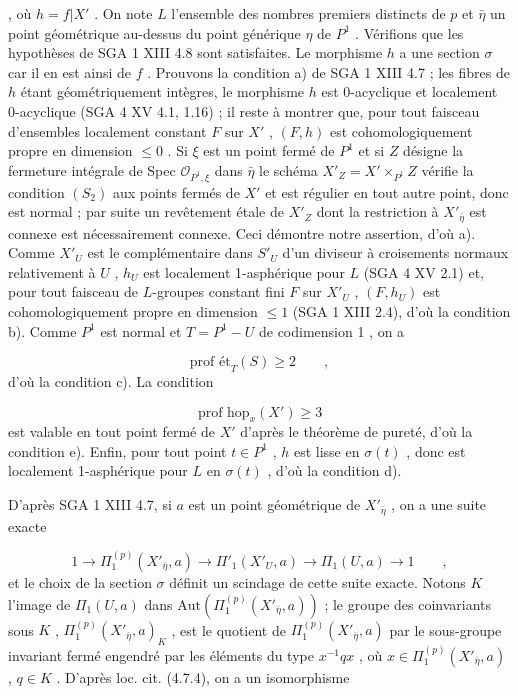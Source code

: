 \qquad ,
où $h = f|X'$ . On note $L$ l'ensemble des nombres premiers distincts de $p$ et $\bar{\eta}$ un point géométrique au-dessus du point générique $\eta$ de $P^1$ . Vérifions que les hypothèses de SGA 1 XIII 4.8 sont satisfaites. Le morphisme $h$ a une section $\sigma$ car il en est ainsi de $f$ . Prouvons la condition a) de SGA 1 XIII 4.7 ; les fibres de $h$ étant géométriquement intègres, le morphisme $h$ est 0-acyclique et localement 0-acyclique (SGA 4 XV 4.1, 1.16) ; il reste à montrer que, pour tout faisceau d'ensembles localement constant $F$ sur $X'$ , $(F,h)$ est cohomologiquement propre en dimension $\leqslant 0$ . Si $\xi$ est un point fermé de $P^1$ et si $Z$ désigne la fermeture intégrale de Spec $\mathcal{O}_{P^1,\xi}$ dans $\bar{\eta}$ le schéma $X'_Z = X'\times_{P^1} Z$ vérifie la condition $(S_2)$ aux points fermés de $X'$ et est régulier en tout autre point, donc est normal ; par suite un revêtement étale de $X'_Z$ dont la restriction à $X'_{\bar{\eta}}$ est connexe est nécessairement connexe. Ceci démontre notre assertion, d'où a). Comme $X'_U$ est le complémentaire dans $S'_U$ d'un diviseur à croisements normaux relativement à $U$ , $h_U$ est localement 1-asphérique pour $L$ (SGA 4 XV 2.1) et, pour tout faisceau de $L$-groupes constant fini $F$ sur $X'_U$ , $(F,h_U)$ est cohomologiquement propre en dimension $\leqslant 1$ (SGA 1 XIII 2.4), d'où la condition b). Comme $P^1$ est normal et $T = P^1 - U$ de
codimension 1 , on a

\begin{equation*}
\text{prof ét}_T(S) \geqslant 2 \qquad ,
\end{equation*}
d'où la condition c). La condition

\begin{equation*}
\text{prof hop}_x(X') \geqslant 3
\end{equation*}
est valable en tout point fermé de $X'$ d'après le théorème de pureté, d'où la condition e). Enfin, pour tout point $t \in P^1$ , $h$ est lisse en $\sigma(t)$ , donc est localement 1-asphérique pour $L$ en $\sigma(t)$ , d'où la condition d).

D'après SGA 1 XIII 4.7, si $a$ est un point géométrique de $X'_{\bar{\eta}}$ , on a une suite exacte

\begin{equation*}
1 \longrightarrow \Pi_1^{(p)}(X'_{\bar{\eta}},a) \longrightarrow \Pi'_1(X'_U,a) \longrightarrow \Pi_1(U,a) \longrightarrow 1 \qquad ,
\end{equation*}
et le choix de la section $\sigma$ définit un scindage de cette suite exacte. Notons $K$ l'image de $\Pi_1(U,a)$ dans $\mathrm{Aut}(\Pi_1^{(p)}(X'_{\bar{\eta}},a))$ ; le groupe des coinvariants sous $K$ , $\Pi_1^{(p)}(X'_{\bar{\eta}},a)_K$ , est le quotient de $\Pi_1^{(p)}(X'_{\bar{\eta}},a)$ par le sous-groupe invariant fermé engendré par les éléments du type $x^{-1}qx$ , où $x \in \Pi_1^{(p)}(X'_{\bar{\eta}},a)$ , $q \in K$ . D'après loc. cit. (4.7.4), on a un isomorphisme

